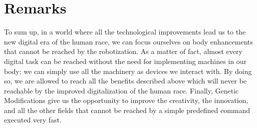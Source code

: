 \section*{Remarks}
\label{sec:gm_remarks}
To sum up, in a world where all the technological improvements lead us to the new digital era of the human race, we can focus ourselves on body enhancements that cannot be reached by the robotization. As a matter of fact, almost every digital task can be reached without the need for implementing machines in our body; we can simply use all the machinery as devices we interact with. By doing so, we are allowed to reach all the benefits described above which will never be reachable by the improved digitalization of the human race. Finally, Genetic Modifications give us the opportunity to improve the creativity, the innovation, and all the other fields that cannot be reached by a simple predefined command executed very fast.
